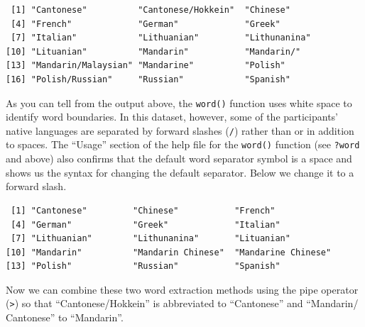 \documentclass[
  letterpaper,
  DIV=11,
  numbers=noendperiod]{scrreprt}
\newenvironment{Shaded}{\begin{snugshade}}{\end{snugshade}}
\newcommand{\AttributeTok}[1]{\textcolor[rgb]{0.40,0.45,0.13}{#1}}
\newcommand{\DecValTok}[1]{\textcolor[rgb]{0.68,0.00,0.00}{#1}}
\newcommand{\FunctionTok}[1]{\textcolor[rgb]{0.28,0.35,0.67}{#1}}
\newcommand{\NormalTok}[1]{\textcolor[rgb]{0.00,0.23,0.31}{#1}}
\newcommand{\SpecialCharTok}[1]{\textcolor[rgb]{0.37,0.37,0.37}{#1}}
\newcommand{\StringTok}[1]{\textcolor[rgb]{0.13,0.47,0.30}{#1}}
\begin{document}
\begin{verbatim}
 [1] "Cantonese"          "Cantonese/Hokkein"  "Chinese"           
 [4] "French"             "German"             "Greek"             
 [7] "Italian"            "Lithuanian"         "Lithunanina"       
[10] "Lituanian"          "Mandarin"           "Mandarin/"         
[13] "Mandarin/Malaysian" "Mandarine"          "Polish"            
[16] "Polish/Russian"     "Russian"            "Spanish"           
\end{verbatim}

As you can tell from the output above, the \texttt{word()} function uses
white space to identify word boundaries. In this dataset, however, some
of the participants' native languages are separated by forward slashes
(\texttt{/}) rather than or in addition to spaces. The ``Usage'' section
of the help file for the \texttt{word()} function (see \texttt{?word}
and above) also confirms that the default word separator symbol is a
space and shows us the syntax for changing the default separator. Below
we change it to a forward slash.

\begin{Shaded}
\end{Shaded}

\begin{verbatim}
 [1] "Cantonese"         "Chinese"           "French"           
 [4] "German"            "Greek"             "Italian"          
 [7] "Lithuanian"        "Lithunanina"       "Lituanian"        
[10] "Mandarin"          "Mandarin Chinese"  "Mandarine Chinese"
[13] "Polish"            "Russian"           "Spanish"          
\end{verbatim}

Now we can combine these two word extraction methods using the pipe
operator (\texttt{\textbar{}\textgreater{}}) so that
``Cantonese/Hokkein'' is abbreviated to ``Cantonese'' and ``Mandarin/
Cantonese'' to ``Mandarin''.
\end{document}
